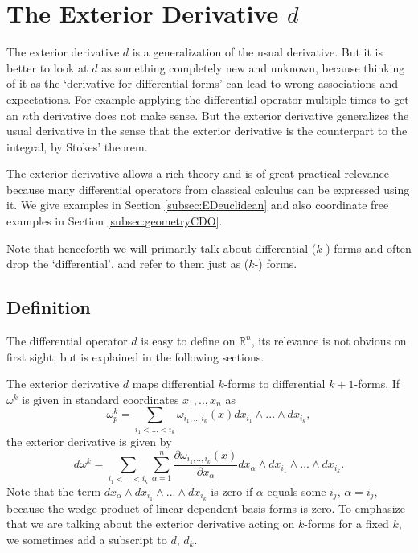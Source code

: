 \section{The Exterior Derivative $d$}
\label{sec:EC_exteriorDerivative}
The exterior derivative $d$ is a generalization of the usual derivative. But it is better to look at $d$ as something completely new and unknown, because thinking of it as the `derivative for differential forms' can lead to wrong associations and expectations. For example applying the differential operator multiple times to get an $n$th derivative does not make sense. But the exterior derivative generalizes the usual derivative in the sense that the exterior derivative is the counterpart to the integral, by Stokes' theorem.

The exterior derivative allows a rich theory and is of great practical relevance because  many differential operators from classical calculus can be expressed using it. We give examples in Section \ref{subsec:EDeuclidean} and also coordinate free examples in Section \ref{subsec:geometryCDO}.

Note that henceforth we will primarily talk about differential ($k$-) forms and often drop the `differential', and refer to them just as ($k$-) forms.

\subsection{Definition} 
The differential operator $d$ is easy to define on $\mathbb R^n$, its relevance is not obvious on first sight, but is explained in the following sections.
\begin{definition}
The exterior derivative $d$ maps differential $k$-forms to differential $k+1$-forms. If $\omega^k$ is given in standard coordinates $x_1,..,x_n$ as 
\[\omega^k_p= \sum_{i_1<...<i_k} \omega_{i_1,..,i_k}(x) dx_{i_1} \wedge ... \wedge dx_{i_k},\]
the exterior derivative is given by
\[d\omega^k = \sum_{i_1<...<i_k}\sum_{\alpha = 1}^{n}\frac{\partial \omega_{i_1,..,i_k}(x)}{\partial x_\alpha} dx_{\alpha} \wedge dx_{i_1} \wedge ... \wedge dx_{i_k}.\]
Note that the term $dx_{\alpha} \wedge dx_{i_1} \wedge ... \wedge dx_{i_k}$ is zero if $\alpha$ equals some $i_j$, $\alpha = i_j$, because the wedge product of linear dependent basis forms is zero. To emphasize that we are talking about the exterior derivative acting on $k$-forms for a fixed $k$, we sometimes add a subscript to $d$, $d_k$.
\end{definition}

